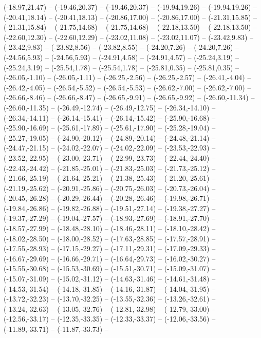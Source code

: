 {  (-18.97,21.47) -- (-19.46,20.37) -- (-19.46,20.37) -- (-19.94,19.26) -- (-19.94,19.26) -- (-20.41,18.14) -- (-20.41,18.13) --
  (-20.86,17.00) -- (-20.86,17.00) -- (-21.31,15.85) -- (-21.31,15.84) -- (-21.75,14.68) -- (-21.75,14.68) -- (-22.18,13.50) --
  (-22.18,13.50) -- (-22.60,12.30) -- (-22.60,12.29) -- (-23.02,11.08) -- (-23.02,11.07) -- (-23.42,9.83) -- (-23.42,9.83) --
  (-23.82,8.56) -- (-23.82,8.55) -- (-24.20,7.26) -- (-24.20,7.26) -- (-24.56,5.93) -- (-24.56,5.93) -- (-24.91,4.58) --
  (-24.91,4.57) -- (-25.24,3.19) -- (-25.24,3.19) -- (-25.54,1.78) -- (-25.54,1.78) -- (-25.81,0.35) -- (-25.81,0.35) --
  (-26.05,-1.10) -- (-26.05,-1.11) -- (-26.25,-2.56) -- (-26.25,-2.57) -- (-26.41,-4.04) -- (-26.42,-4.05) -- (-26.54,-5.52) --
  (-26.54,-5.53) -- (-26.62,-7.00) -- (-26.62,-7.00) -- (-26.66,-8.46) -- (-26.66,-8.47) -- (-26.65,-9.91) -- (-26.65,-9.92) --
  (-26.60,-11.34) -- (-26.60,-11.35) -- (-26.49,-12.74) -- (-26.49,-12.75) -- (-26.34,-14.10) -- (-26.34,-14.11) -- (-26.14,-15.41) --
  (-26.14,-15.42) -- (-25.90,-16.68) -- (-25.90,-16.69) -- (-25.61,-17.89) -- (-25.61,-17.90) -- (-25.28,-19.04) -- (-25.27,-19.05) --
  (-24.90,-20.12) -- (-24.89,-20.14) -- (-24.48,-21.14) -- (-24.47,-21.15) -- (-24.02,-22.07) -- (-24.02,-22.09) -- (-23.53,-22.93) --
  (-23.52,-22.95) -- (-23.00,-23.71) -- (-22.99,-23.73) -- (-22.44,-24.40) -- (-22.43,-24.42) -- (-21.85,-25.01) -- (-21.83,-25.03) --
  (-21.73,-25.12) -- (-21.66,-25.19) -- (-21.64,-25.21) -- (-21.38,-25.43) -- (-21.20,-25.61) -- (-21.19,-25.62) -- (-20.91,-25.86) --
  (-20.75,-26.03) -- (-20.73,-26.04) -- (-20.45,-26.28) -- (-20.29,-26.44) -- (-20.28,-26.46) -- (-19.98,-26.71) -- (-19.84,-26.86) --
  (-19.82,-26.88) -- (-19.51,-27.14) -- (-19.38,-27.27) -- (-19.37,-27.29) -- (-19.04,-27.57) -- (-18.93,-27.69) -- (-18.91,-27.70) --
  (-18.57,-27.99) -- (-18.48,-28.10) -- (-18.46,-28.11) -- (-18.10,-28.42) -- (-18.02,-28.50) -- (-18.00,-28.52) -- (-17.63,-28.85) --
  (-17.57,-28.91) -- (-17.55,-28.93) -- (-17.15,-29.27) -- (-17.11,-29.31) -- (-17.09,-29.33) -- (-16.67,-29.69) -- (-16.66,-29.71) --
  (-16.64,-29.73) -- (-16.02,-30.27) -- (-15.55,-30.68) -- (-15.53,-30.69) -- (-15.51,-30.71) -- (-15.09,-31.07) -- (-15.07,-31.09) --
  (-15.02,-31.12) -- (-14.63,-31.46) -- (-14.61,-31.48) -- (-14.53,-31.54) -- (-14.18,-31.85) -- (-14.16,-31.87) -- (-14.04,-31.95) --
  (-13.72,-32.23) -- (-13.70,-32.25) -- (-13.55,-32.36) -- (-13.26,-32.61) -- (-13.24,-32.63) -- (-13.05,-32.76) -- (-12.81,-32.98) --
  (-12.79,-33.00) -- (-12.56,-33.17) -- (-12.35,-33.35) -- (-12.33,-33.37) -- (-12.06,-33.56) -- (-11.89,-33.71) -- (-11.87,-33.73) --
}
